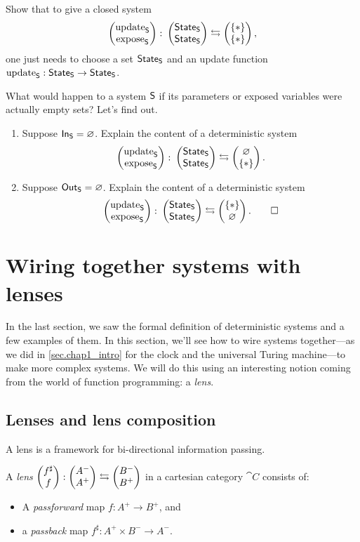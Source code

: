 \documentclass[DynamicalBook]{subfiles}
\begin{document}
\begin{exercise}
Show that to give a closed system
\[\begin{pmatrix}{\mathrm{update}_{\mathsf{S}}} \\ {\mathrm{expose}_{\mathsf{S}}} \end{pmatrix}\colon\begin{pmatrix}{\mathsf{State}_{\mathsf{S}}} \\ {\mathsf{State}_{\mathsf{S}}} \end{pmatrix}\leftrightarrows\begin{pmatrix}{\{*\}} \\ {\{*\}} \end{pmatrix},\]
one just needs to choose a set $\mathsf{State}_{\mathsf{S}}$ and an update function $\mathrm{update}_{\mathsf{S}} :  \mathsf{State}_{\mathsf{S}} \to \mathsf{State}_{\mathsf{S}}$.
\end{exercise}

\begin{exercise}
What would happen to a system $\mathsf{S}$ if its parameters or exposed variables were actually empty sets? Let's find out.
\begin{enumerate}
	\item Suppose $\mathsf{In}_{\mathsf{S}}=\varnothing$. Explain the content of a deterministic system \[\begin{pmatrix}{\mathrm{update}_{\mathsf{S}}} \\ {\mathrm{expose}_{\mathsf{S}}} \end{pmatrix}\colon\begin{pmatrix}{\mathsf{State}_{\mathsf{S}}} \\ {\mathsf{State}_{\mathsf{S}}} \end{pmatrix}\leftrightarrows\begin{pmatrix}{\varnothing} \\ {\{*\}} \end{pmatrix}.\]
	\item Suppose $\mathsf{Out}_{\mathsf{S}}=\varnothing$. Explain the content of a deterministic system \[\begin{pmatrix}{\mathrm{update}_{\mathsf{S}}} \\ {\mathrm{expose}_{\mathsf{S}}} \end{pmatrix}\colon\begin{pmatrix}{\mathsf{State}_{\mathsf{S}}} \\ {\mathsf{State}_{\mathsf{S}}} \end{pmatrix}\leftrightarrows\begin{pmatrix}{\{*\}} \\ {\varnothing} \end{pmatrix}.
	\qedhere
\]	
\end{enumerate}
\end{exercise}

\section{Wiring together systems with lenses}

In the last section, we saw the formal definition of deterministic systems and a
few examples of them. In this section, we'll see how to wire systems together---as we did in \cref{sec.chap1_intro} for the clock and the universal Turing machine---to
make more complex systems. We will do this using an interesting notion coming
from the world of function programming: a \emph{lens}.

\subsection{Lenses and lens composition}\label{sec.lens_discrete}

A lens is a framework for bi-directional information passing.

\begin{definition}\label{def.lens}
  A \emph{lens} $\begin{pmatrix}{f^{\sharp}} \\ {f} \end{pmatrix} : \begin{pmatrix}{A^-} \\ {A^+} \end{pmatrix} \leftrightarrows
  \begin{pmatrix}{B^-} \\ {B^+} \end{pmatrix}$ in a cartesian category $\cat{C}$ consists of:
  \begin{itemize}
  \item A \emph{passforward} map $f : A^+ \to B^+$, and
    \item a \emph{passback} map $f^{\sharp} : A^+ \times B^- \to A^-$.
  \end{itemize}
\end{definition}
\end{document}
